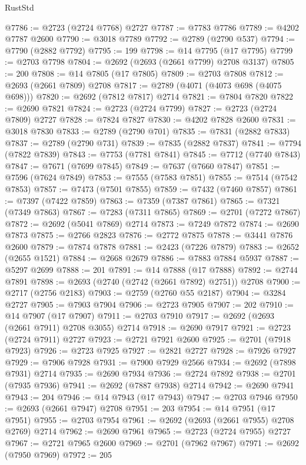 \begin{lexlean}{RustStd}
\begin{coremodule}
{\begin{coremodule}
{{{{{{{{{{{{{{{{{{{{{{{{{{{{{{{{{{{{{{{@7786 := @2723 (@2724 @7768) @2727
@7787 := @7783 @7786
@7789 := @4202 @7787 @2600
@7790 := @3018 @7789
@7792 := @2789 (@2790 @537)
@7794 := @7790 (@2882 @7792)
@7795 := 199
@7798 := @14 @7795 (@17 @7795)
@7799 := @2703 @7798
@7804 := @2692 (@2693 (@2661 @7799) @2708 @3137)
@7805 := 200
@7808 := @14 @7805 (@17 @7805)
@7809 := @2703 @7808
@7812 := @2693 (@2661 @7809) @2708
@7817 := @2789 (@4071 (@4073 @698 (@4075 @698)))
@7820 := @2692 (@7812 @7817) @2714
@7821 := @7804 @7820
@7822 := @2690 @7821
@7824 := @2723 (@2724 @7799)
@7827 := @2723 (@2724 @7809) @2727
@7828 := @7824 @7827
@7830 := @4202 @7828 @2600
@7831 := @3018 @7830
@7833 := @2789 (@2790 @701)
@7835 := @7831 (@2882 @7833)
@7837 := @2789 (@2790 @731)
@7839 := @7835 (@2882 @7837)
@7841 := @7794 (@7822 @7839)
@7843 := @7753 (@7781 @7841)
@7845 := @7712 (@7740 @7843)
@7847 := @7671 (@7699 @7845)
@7849 := @7637 (@7660 @7847)
@7851 := @7596 (@7624 @7849)
@7853 := @7555 (@7583 @7851)
@7855 := @7514 (@7542 @7853)
@7857 := @7473 (@7501 @7855)
@7859 := @7432 (@7460 @7857)
@7861 := @7397 (@7422 @7859)
@7863 := @7359 (@7387 @7861)
@7865 := @7321 (@7349 @7863)
@7867 := @7283 (@7311 @7865)
@7869 := @2701 (@7272 @7867)
@7872 := @2692 (@5041 @7869) @2714
@7873 := @7249 @7872
@7874 := @2690 @7873
@7875 := @2766 @2823
@7876 := @2772 @7875
@7878 := @3441 @7876 @2600
@7879 := @7874 @7878
@7881 := @2423 (@7226 @7879)
@7883 := @2652 (@2655 @1521)
@7884 := @2668 @2679
@7886 := @7883 @7884 @5937
@7887 := @5297 @2699
@7888 := 201
@7891 := @14 @7888 (@17 @7888)
@7892 := @2744 @7891
@7898 := @2693 (@2740 (@2742 (@2661 @7892) @2751)) @2708
@7900 := @2717 (@2756 @2183)
@7903 := @2759 (@2760 @55 @2187)
@7904 := @3284 @2727
@7905 := @7903 @7904
@7906 := @2723 @7905
@7907 := 202
@7910 := @14 @7907 (@17 @7907)
@7911 := @2703 @7910
@7917 := @2692 (@2693 (@2661 @7911) @2708 @3055) @2714
@7918 := @2690 @7917
@7921 := @2723 (@2724 @7911) @2727
@7923 := @2721 @7921 @2600
@7925 := @2701 (@7918 @7923)
@7926 := @2723 @7925
@7927 := @2821 @2727
@7928 := @7926 @7927
@7929 := @7906 @7928
@7931 := @7900 @7929 @2566
@7934 := @2692 (@7898 @7931) @2714
@7935 := @2690 @7934
@7936 := @2724 @7892
@7938 := @2701 (@7935 @7936)
@7941 := @2692 (@7887 @7938) @2714
@7942 := @2690 @7941
@7943 := 204
@7946 := @14 @7943 (@17 @7943)
@7947 := @2703 @7946
@7950 := @2693 (@2661 @7947) @2708
@7951 := 203
@7954 := @14 @7951 (@17 @7951)
@7955 := @2703 @7954
@7961 := @2692 (@2693 (@2661 @7955) @2708 @2769) @2714
@7962 := @2690 @7961
@7965 := @2723 (@2724 @7955) @2727
@7967 := @2721 @7965 @2600
@7969 := @2701 (@7962 @7967)
@7971 := @2692 (@7950 @7969)
@7972 := 205
}}}}}}}}}}}}}}}}}}}}}}}}}}}}}}}}}}}}}}}
\end{coremodule}}
\end{coremodule}
\end{lexlean}

